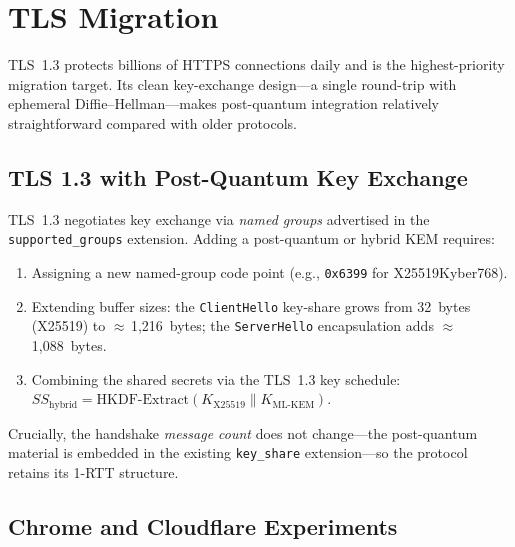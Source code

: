 \section{TLS Migration}
\label{sec:tls-migration}

TLS~1.3 protects billions of HTTPS connections daily and is the highest-priority migration target.  Its clean key-exchange design---a single round-trip with ephemeral Diffie--Hellman---makes post-quantum integration relatively straightforward compared with older protocols.

\subsection{TLS 1.3 with Post-Quantum Key Exchange}
\label{subsec:tls13-pq}

TLS~1.3 negotiates key exchange via \emph{named groups} advertised in the \texttt{supported\_groups} extension.  Adding a post-quantum or hybrid KEM requires:
\begin{enumerate}
\item Assigning a new named-group code point (e.g., \texttt{0x6399} for X25519Kyber768).
\item Extending buffer sizes: the \texttt{ClientHello} key-share grows from 32~bytes (X25519) to $\approx$\,1{,}216~bytes; the \texttt{ServerHello} encapsulation adds $\approx$\,1{,}088~bytes.
\item Combining the shared secrets via the TLS~1.3 key schedule: $\mathit{SS}_{\mathrm{hybrid}} = \mathrm{HKDF\text{-}Extract}(K_{\mathrm{X25519}} \| K_{\mathrm{ML\text{-}KEM}})$.
\end{enumerate}

Crucially, the handshake \emph{message count} does not change---the post-quantum material is embedded in the existing \texttt{key\_share} extension---so the protocol retains its 1-RTT structure.

\subsection{Chrome and Cloudflare Experiments}
\label{subsec:chrome-cloudflare}

